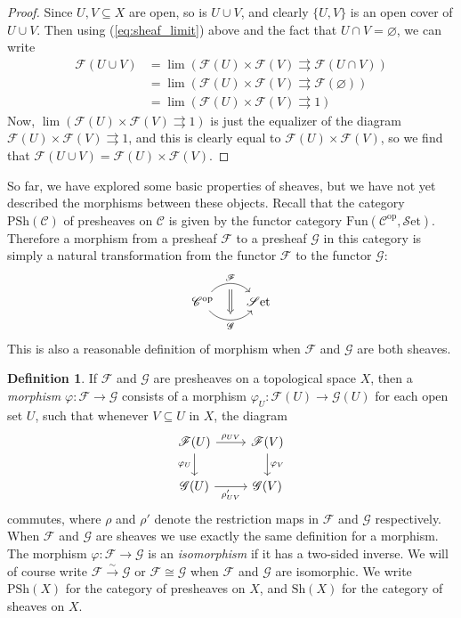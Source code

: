 \documentclass[10pt,oneside]{book}
\def\~#1{\mathscr{#1}}
\newcommand{\op}{\mathrm{op}}
\newcommand{\isom}{\xrightarrow{\sim}}
\newcommand{\Sh}{\mathrm{Sh}}
\newcommand{\PSh}{\mathrm{PSh}}
\newcommand{\Fun}{\mathrm{Fun}}
\newcommand{\Set}{\~S\mathrm{et}}
\newcommand{\vp}{\varphi}
\theoremstyle{plain}
\theoremstyle{definition}
\newtheorem{defn}[thm]{Definition}
\theoremstyle{remark}
\numberwithin{equation}{section}
\numberwithin{figure}{section}
\begin{document}
\begin{proof}
    Since $U, V \subseteq X$ are open, so is $U \cup V$, and clearly $\{U, V\}$ is an open cover of $U \cup V$. Then using (\ref{eq:sheaf_limit}) above and the fact that $U \cap V = \varnothing$, we can write
    \begin{align*}
        \~F(U \cup V) &= \lim \left(\~F(U) \times \~F(V) \rightrightarrows \~F(U \cap V) \right) \\
        &= \lim \left(\~F(U) \times \~F(V) \rightrightarrows \~F(\varnothing) \right)\\
        &= \lim \left(\~F(U) \times \~F(V) \rightrightarrows 1\right)
    \end{align*}
    Now, $\lim \left(\~F(U) \times \~F(V) \rightrightarrows 1\right)$ is just the equalizer of the diagram $\~F(U) \times \~F(V) \rightrightarrows 1$, and this is clearly equal to $\~F(U) \times \~F(V)$, so we find that $\~F(U \cup V) = \~F(U) \times \~F(V)$.
\end{proof}

So far, we have explored some basic properties of sheaves, but we have not yet described the morphisms between these objects. Recall that the category $\PSh(\~C)$ of presheaves on $\~C$ is given by the functor category $\Fun(\~C^\op, \Set)$. Therefore a morphism from a presheaf $\~F$ to a presheaf $\~G$ in this category is simply a natural transformation from the functor $\~F$ to the functor $\~G$:
\[\begin{tikzcd}[column sep = scriptsize]
        {\~C^\op} & \Set
        \arrow[""{name=0, anchor=center, inner sep=0}, "\~F", bend left=50, from=1-1, to=1-2]
        \arrow[""{name=1, anchor=center, inner sep=0}, "\~G"', bend right=50, from=1-1, to=1-2]
        \arrow[shorten <=4pt, shorten >=4pt, Rightarrow, from=0, to=1]
    \end{tikzcd}\]
This is also a reasonable definition of morphism when $\~F$ and $\~G$ are both sheaves. 

\begin{defn}
If $\~F$ and $\~G$ are presheaves on a topological space $X$, then a \emph{morphism} $\vp: \~F \to \~G$ consists of a morphism $\vp_U: \~F(U) \to \~G(U)$ for each open set $U$, such that whenever $V \subseteq U$ in $X$, the diagram
\[\begin{tikzcd}
    {\~F(U)} & {\~F(V)} \\
    {\~G(U)} & {\~G(V)}
    \arrow["{\rho_{UV}}", from=1-1, to=1-2]
    \arrow["{\vp_U}"', from=1-1, to=2-1]
    \arrow["{\vp_V}", from=1-2, to=2-2]
    \arrow["{\rho'_{UV}}"', from=2-1, to=2-2]
\end{tikzcd}\]
commutes, where $\rho$ and $\rho'$ denote the restriction maps in $\~F$ and $\~G$ respectively. When $\~F$ and $\~G$ are sheaves we use exactly the same definition for a morphism. The morphism $\vp: \~F \to \~G$ is an \emph{isomorphism} if it has a two-sided inverse. We will of course write $\~F \isom \~G$ or $\~F \cong \~G$ when $\~F$ and $\~G$ are isomorphic. We write $\PSh(X)$ for the category of presheaves on $X$, and $\Sh(X)$ for the category of sheaves on $X$.
\end{defn}
\end{document}
